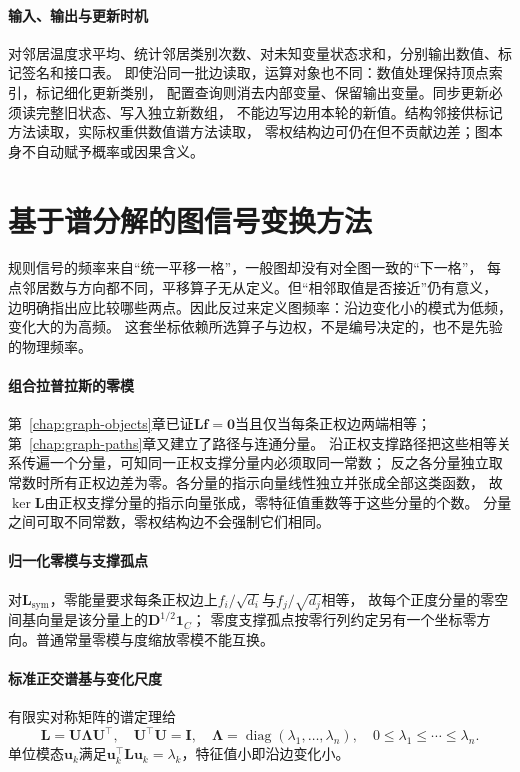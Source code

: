 \paragraph{输入、输出与更新时机}
对邻居温度求平均、统计邻居类别次数、对未知变量状态求和，分别输出数值、标记签名和接口表。
即使沿同一批边读取，运算对象也不同：数值处理保持顶点索引，标记细化更新类别，
配置查询则消去内部变量、保留输出变量。同步更新必须读完整旧状态、写入独立新数组，
不能边写边用本轮的新值。结构邻接供标记方法读取，实际权重供数值谱方法读取，
零权结构边可仍在但不贡献边差；图本身不自动赋予概率或因果含义。

\section{基于谱分解的图信号变换方法}
\label{sec:signal-analysis-graph-state-kernels}

规则信号的频率来自“统一平移一格”，一般图却没有对全图一致的“下一格”，
每点邻居数与方向都不同，平移算子无从定义。但“相邻取值是否接近”仍有意义，
边明确指出应比较哪些两点。因此反过来定义图频率：沿边变化小的模式为低频，变化大的为高频。
这套坐标依赖所选算子与边权，不是编号决定的，也不是先验的物理频率。

\paragraph{组合拉普拉斯的零模}
第~\ref{chap:graph-objects}章已证$\bm L\bm f=\bm0$当且仅当每条正权边两端相等；第~\ref{chap:graph-paths}章又建立了路径与连通分量。
沿正权支撑路径把这些相等关系传遍一个分量，可知同一正权支撑分量内必须取同一常数；
反之各分量独立取常数时所有正权边差为零。各分量的指示向量线性独立并张成全部这类函数，
故$\ker\bm L$由正权支撑分量的指示向量张成，零特征值重数等于这些分量的个数。
分量之间可取不同常数，零权结构边不会强制它们相同。

\paragraph{归一化零模与支撑孤点}
对$\bm L_{\mathrm{sym}}$，零能量要求每条正权边上$f_i/\sqrt{d_i}$与$f_j/\sqrt{d_j}$相等，
故每个正度分量的零空间基向量是该分量上的$\bm D^{1/2}\bm1_C$；
零度支撑孤点按零行列约定另有一个坐标零方向。普通常量零模与度缩放零模不能互换。

\paragraph{标准正交谱基与变化尺度}
有限实对称矩阵的谱定理给
\[
  \bm L=\bm U\bm\Lambda\bm U^\top,\quad \bm U^\top\bm U=\bm I,\quad
  \bm\Lambda=\operatorname{diag}(\lambda_1,\ldots,\lambda_n),\quad 0\leq\lambda_1\leq\cdots\leq\lambda_n.
\]
单位模态$\bm u_k$满足$\bm u_k^\top\bm L\bm u_k=\lambda_k$，特征值小即沿边变化小。

